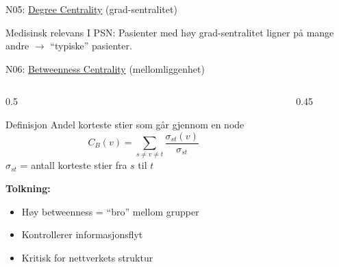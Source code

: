 \documentclass[aspectratio=169, 10pt]{beamer}
\begin{document}
\begin{frame}{N05: \href{https://en.wikipedia.org/wiki/Degree_centrality}{Degree Centrality} (grad-sentralitet)}
    \vspace{1mm}
    
    \begin{block}{\footnotesize Medisinsk relevans}
        \footnotesize I PSN: Pasienter med høy grad-sentralitet ligner på mange andre $\rightarrow$ ``typiske'' pasienter.
    \end{block}
    
\end{frame}

\begin{frame}{N06: \href{https://en.wikipedia.org/wiki/Betweenness_centrality}{Betweenness Centrality} (mellomliggenhet)}
    
    \begin{columns}
        \begin{column}{0.5\textwidth}
            \begin{block}{Definisjon}
                Andel korteste stier som går gjennom en node
                \[
                C_B(v) = \sum_{s \neq v \neq t} \frac{\sigma_{st}(v)}{\sigma_{st}}
                \]
                $\sigma_{st}$ = antall korteste stier fra $s$ til $t$
            \end{block}
            
            \vspace{2mm}
            
            \textbf{Tolkning:}
            \begin{itemize}
                \item Høy betweenness = ``bro'' mellom grupper
                \item Kontrollerer informasjonsflyt
                \item Kritisk for nettverkets struktur
            \end{itemize}
        \end{column}
        
        \begin{column}{0.45\textwidth}
            \begin{center}
\end{center}
\end{column}
\end{columns}
\end{frame}
\end{document}
